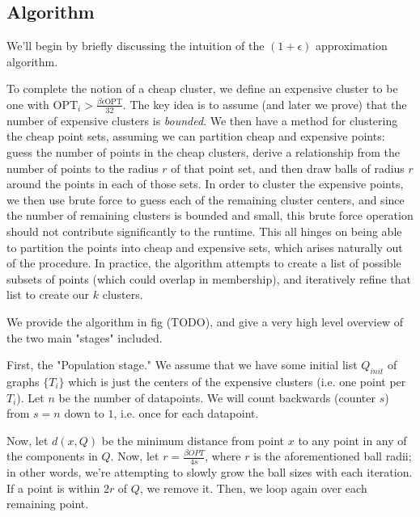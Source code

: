 \documentclass[paper=a4, fontsize=10.5pt]{scrartcl} %
\numberwithin{equation}{section} %
\numberwithin{figure}{section} %
\numberwithin{table}{section} %
\begin{document}


\subsection{Algorithm}
We'll begin by briefly discussing the intuition of the $(1 + \epsilon)$ approximation algorithm.

To complete the notion of a cheap cluster, we define an expensive cluster to be one with $\text{OPT}_i > \frac{\beta\epsilon\text{OPT}}{32}$. The key idea is to assume (and later we prove) that the number of expensive clusters is \emph{bounded}.  We then have a method for clustering the cheap point sets, assuming we can partition cheap and expensive points: guess the number of points in the cheap clusters, derive a relationship from the number of points to the radius $r$ of that point set, and then draw balls of radius $r$ around the points in each of those sets.  In order to cluster the expensive points, we then use brute force to guess each of the remaining cluster centers, and since the number of remaining clusters is bounded and small, this brute force operation should not contribute significantly to the runtime.  This all hinges on being able to partition the points into cheap and expensive sets, which arises naturally out of the procedure.  In practice, the algorithm attempts to create a list of possible subsets of points (which could overlap in membership), and iteratively refine that list to create our $k$ clusters. 



We provide the algorithm in fig (TODO), and give a very high level overview of the two main "stages" included.

First, the "Population stage."  We assume that we have some initial list $Q_{init}$ of graphs $\{T_i\}$ which is just the centers of the expensive clusters (i.e. one point per $T_i$).  Let $n$ be the number of datapoints.  We will count backwards (counter $s$) from $s=n$ down to $1$, i.e. once for each datapoint.

Now, let $d(x, Q)$ be the minimum distance from point $x$ to any point in any of the components in $Q$.  Now, let $r = \frac{\beta OPT}{4 s}$, where $r$ is the aforementioned ball radii; in other words, we're attempting to slowly grow the ball sizes with each iteration.  If a point is within $2r$ of $Q$, we remove it. Then, we loop again over each remaining point.
\end{document}
